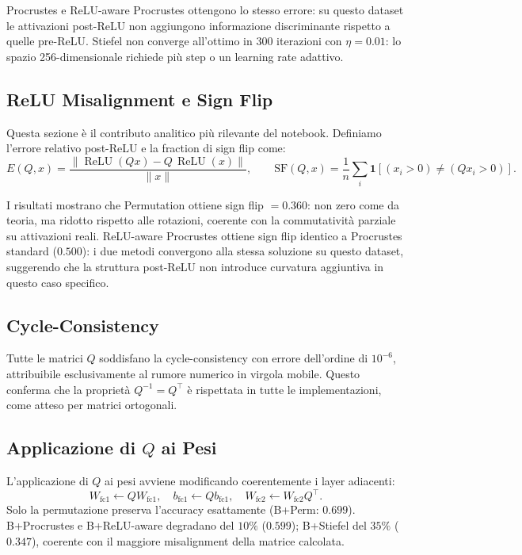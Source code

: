 \documentclass[11pt, a4paper]{article}
\begin{document}
Procrustes e ReLU-aware Procrustes ottengono lo stesso errore: su questo dataset le attivazioni post-ReLU non aggiungono informazione discriminante rispetto a quelle pre-ReLU. Stiefel non converge all'ottimo in 300 iterazioni con $\eta=0.01$: lo spazio 256-dimensionale richiede più step o un learning rate adattivo.

\subsection{ReLU Misalignment e Sign Flip}

Questa sezione è il contributo analitico più rilevante del notebook. Definiamo l'errore relativo post-ReLU e la fraction di sign flip come:
\[
E(Q, x) = \frac{\|\operatorname{ReLU}(Qx) - Q\,\operatorname{ReLU}(x)\|}{\|x\|}, \qquad
\text{SF}(Q, x) = \frac{1}{n}\sum_i \mathbf{1}[(x_i > 0) \neq (Qx_i > 0)].
\]

I risultati mostrano che Permutation ottiene sign flip $= 0.360$: non zero come da teoria, ma ridotto rispetto alle rotazioni, coerente con la commutatività parziale su attivazioni reali. ReLU-aware Procrustes ottiene sign flip identico a Procrustes standard ($0.500$): i due metodi convergono alla stessa soluzione su questo dataset, suggerendo che la struttura post-ReLU non introduce curvatura aggiuntiva in questo caso specifico.

\subsection{Cycle-Consistency}

Tutte le matrici $Q$ soddisfano la cycle-consistency con errore dell'ordine di $10^{-6}$, attribuibile esclusivamente al rumore numerico in virgola mobile. Questo conferma che la proprietà $Q^{-1} = Q^\top$ è rispettata in tutte le implementazioni, come atteso per matrici ortogonali.

\subsection{Applicazione di $Q$ ai Pesi}

L'applicazione di $Q$ ai pesi avviene modificando coerentemente i layer adiacenti:
\[
W_{\text{fc1}} \leftarrow Q W_{\text{fc1}}, \quad
b_{\text{fc1}} \leftarrow Q b_{\text{fc1}}, \quad
W_{\text{fc2}} \leftarrow W_{\text{fc2}} Q^\top.
\]
Solo la permutazione preserva l'accuracy esattamente (B+Perm: $0.699$). B+Procrustes e B+ReLU-aware degradano del $10\%$ ($0.599$); B+Stiefel del $35\%$ ($0.347$), coerente con il maggiore misalignment della matrice calcolata.
\end{document}
